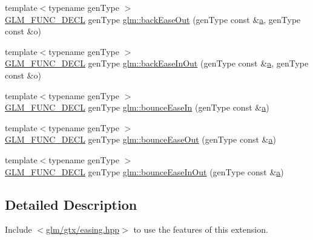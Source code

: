 \begin{DoxyCompactItemize}
\item 
{\footnotesize template$<$typename gen\+Type $>$ }\\\hyperlink{setup_8hpp_ab2d052de21a70539923e9bcbf6e83a51}{G\+L\+M\+\_\+\+F\+U\+N\+C\+\_\+\+D\+E\+CL} gen\+Type \hyperlink{group__gtx__easing_ga640c1ac6fe9d277a197da69daf60ee4f}{glm\+::back\+Ease\+Out} (gen\+Type const \&\hyperlink{_s_d_l__opengl__glext_8h_a3309789fc188587d666cda5ece79cf82}{a}, gen\+Type const \&o)
\item 
{\footnotesize template$<$typename gen\+Type $>$ }\\\hyperlink{setup_8hpp_ab2d052de21a70539923e9bcbf6e83a51}{G\+L\+M\+\_\+\+F\+U\+N\+C\+\_\+\+D\+E\+CL} gen\+Type \hyperlink{group__gtx__easing_ga68a7b760f2afdfab298d5cd6d7611fb1}{glm\+::back\+Ease\+In\+Out} (gen\+Type const \&\hyperlink{_s_d_l__opengl__glext_8h_a3309789fc188587d666cda5ece79cf82}{a}, gen\+Type const \&o)
\item 
{\footnotesize template$<$typename gen\+Type $>$ }\\\hyperlink{setup_8hpp_ab2d052de21a70539923e9bcbf6e83a51}{G\+L\+M\+\_\+\+F\+U\+N\+C\+\_\+\+D\+E\+CL} gen\+Type \hyperlink{group__gtx__easing_gaac30767f2e430b0c3fc859a4d59c7b5b}{glm\+::bounce\+Ease\+In} (gen\+Type const \&\hyperlink{_s_d_l__opengl__glext_8h_a3309789fc188587d666cda5ece79cf82}{a})
\item 
{\footnotesize template$<$typename gen\+Type $>$ }\\\hyperlink{setup_8hpp_ab2d052de21a70539923e9bcbf6e83a51}{G\+L\+M\+\_\+\+F\+U\+N\+C\+\_\+\+D\+E\+CL} gen\+Type \hyperlink{group__gtx__easing_ga94007005ff0dcfa0749ebfa2aec540b2}{glm\+::bounce\+Ease\+Out} (gen\+Type const \&\hyperlink{_s_d_l__opengl__glext_8h_a3309789fc188587d666cda5ece79cf82}{a})
\item 
{\footnotesize template$<$typename gen\+Type $>$ }\\\hyperlink{setup_8hpp_ab2d052de21a70539923e9bcbf6e83a51}{G\+L\+M\+\_\+\+F\+U\+N\+C\+\_\+\+D\+E\+CL} gen\+Type \hyperlink{group__gtx__easing_gadf9f38eff1e5f4c2fa5b629a25ae413e}{glm\+::bounce\+Ease\+In\+Out} (gen\+Type const \&\hyperlink{_s_d_l__opengl__glext_8h_a3309789fc188587d666cda5ece79cf82}{a})
\end{DoxyCompactItemize}


\subsection{Detailed Description}
Include $<$\hyperlink{easing_8hpp}{glm/gtx/easing.\+hpp}$>$ to use the features of this extension.

